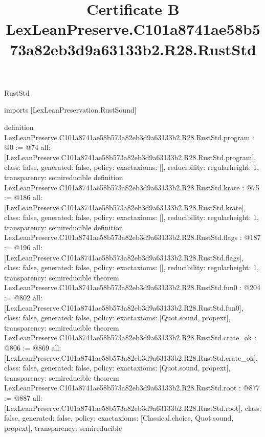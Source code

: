 \begin{lexlean}{RustStd}
\title{Certificate B LexLeanPreserve.C101a8741ae58b573a82eb3d9a63133b2.R28.RustStd}
\begin{coremodule}
imports [LexLeanPreservation.RustSound]

definition LexLeanPreserve.C101a8741ae58b573a82eb3d9a63133b2.R28.RustStd.program : @0 := @74 {
  all: [LexLeanPreserve.C101a8741ae58b573a82eb3d9a63133b2.R28.RustStd.program],
  class: false,
  generated: false,
  policy: exact{axioms: []},
  reducibility: regular{height: 1},
  transparency: semireducible
}
definition LexLeanPreserve.C101a8741ae58b573a82eb3d9a63133b2.R28.RustStd.krate : @75 := @186 {
  all: [LexLeanPreserve.C101a8741ae58b573a82eb3d9a63133b2.R28.RustStd.krate],
  class: false,
  generated: false,
  policy: exact{axioms: []},
  reducibility: regular{height: 1},
  transparency: semireducible
}
definition LexLeanPreserve.C101a8741ae58b573a82eb3d9a63133b2.R28.RustStd.flags : @187 := @196 {
  all: [LexLeanPreserve.C101a8741ae58b573a82eb3d9a63133b2.R28.RustStd.flags],
  class: false,
  generated: false,
  policy: exact{axioms: []},
  reducibility: regular{height: 1},
  transparency: semireducible
}
theorem LexLeanPreserve.C101a8741ae58b573a82eb3d9a63133b2.R28.RustStd.fun0 : @204 := @802 {
  all: [LexLeanPreserve.C101a8741ae58b573a82eb3d9a63133b2.R28.RustStd.fun0],
  class: false,
  generated: false,
  policy: exact{axioms: [Quot.sound, propext]},
  transparency: semireducible
}
theorem LexLeanPreserve.C101a8741ae58b573a82eb3d9a63133b2.R28.RustStd.crate_ok : @806 := @869 {
  all: [LexLeanPreserve.C101a8741ae58b573a82eb3d9a63133b2.R28.RustStd.crate_ok],
  class: false,
  generated: false,
  policy: exact{axioms: [Quot.sound, propext]},
  transparency: semireducible
}
theorem LexLeanPreserve.C101a8741ae58b573a82eb3d9a63133b2.R28.RustStd.root : @877 := @887 {
  all: [LexLeanPreserve.C101a8741ae58b573a82eb3d9a63133b2.R28.RustStd.root],
  class: false,
  generated: false,
  policy: exact{axioms: [Classical.choice, Quot.sound, propext]},
  transparency: semireducible
}


\end{coremodule}
\end{lexlean}
